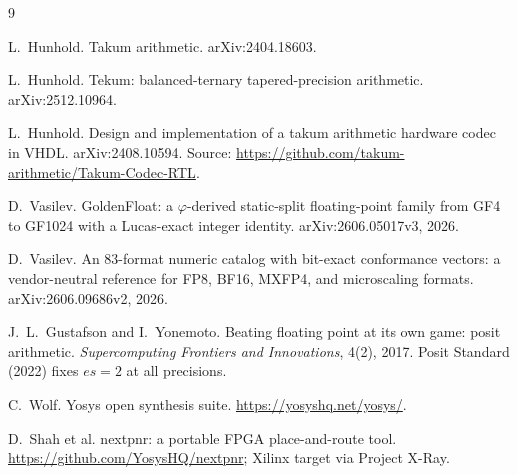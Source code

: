 \documentclass[11pt]{article}
\theoremstyle{definition}
\begin{document}
\begin{thebibliography}{9}

L.~Hunhold.
\newblock Takum arithmetic.
\newblock arXiv:2404.18603.

L.~Hunhold.
\newblock Tekum: balanced-ternary tapered-precision arithmetic.
\newblock arXiv:2512.10964.

L.~Hunhold.
\newblock Design and implementation of a takum arithmetic hardware codec in VHDL.
\newblock arXiv:2408.10594. Source: \url{https://github.com/takum-arithmetic/Takum-Codec-RTL}.

D.~Vasilev.
\newblock GoldenFloat: a $\varphi$-derived static-split floating-point family
from GF4 to GF1024 with a Lucas-exact integer identity.
\newblock arXiv:2606.05017v3, 2026.

D.~Vasilev.
\newblock An 83-format numeric catalog with bit-exact conformance vectors: a
vendor-neutral reference for FP8, BF16, MXFP4, and microscaling formats.
\newblock arXiv:2606.09686v2, 2026.

J.~L.~Gustafson and I.~Yonemoto.
\newblock Beating floating point at its own game: posit arithmetic.
\newblock \emph{Supercomputing Frontiers and Innovations}, 4(2), 2017.
\newblock Posit Standard (2022) fixes $es=2$ at all precisions.

C.~Wolf.
\newblock Yosys open synthesis suite.
\newblock \url{https://yosyshq.net/yosys/}.

D.~Shah et al.
\newblock nextpnr: a portable FPGA place-and-route tool.
\newblock \url{https://github.com/YosysHQ/nextpnr}; Xilinx target via Project X-Ray.


\end{thebibliography}
\end{document}
